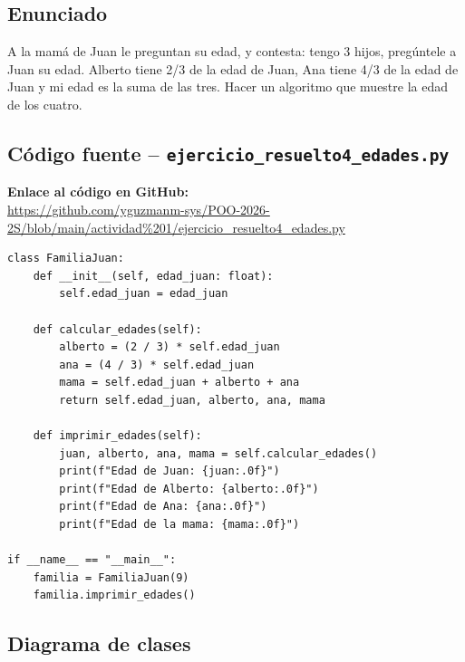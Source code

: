 \documentclass[12pt,a4paper]{article}
\begin{document}
\subsection{Enunciado}
A la mam\'a de Juan le preguntan su edad, y contesta: tengo 3 hijos, preg\'untele a Juan su edad. Alberto tiene 2/3 de la edad de Juan, Ana tiene 4/3 de la edad de Juan y mi edad es la suma de las tres. Hacer un algoritmo que muestre la edad de los cuatro.

\subsection{C\'odigo fuente -- \texttt{ejercicio\_resuelto4\_edades.py}}
\noindent \textbf{Enlace al c\'odigo en GitHub:}\\
\url{https://github.com/yguzmanm-sys/POO-2026-2S/blob/main/actividad%201/ejercicio_resuelto4_edades.py}\\[0.3cm]

\begin{lstlisting}[style=pythonstyle, caption={Familia de Juan -- ejercicio\_resuelto4\_edades.py}]
class FamiliaJuan:
    def __init__(self, edad_juan: float):
        self.edad_juan = edad_juan

    def calcular_edades(self):
        alberto = (2 / 3) * self.edad_juan
        ana = (4 / 3) * self.edad_juan
        mama = self.edad_juan + alberto + ana
        return self.edad_juan, alberto, ana, mama

    def imprimir_edades(self):
        juan, alberto, ana, mama = self.calcular_edades()
        print(f"Edad de Juan: {juan:.0f}")
        print(f"Edad de Alberto: {alberto:.0f}")
        print(f"Edad de Ana: {ana:.0f}")
        print(f"Edad de la mama: {mama:.0f}")

if __name__ == "__main__":
    familia = FamiliaJuan(9)
    familia.imprimir_edades()
\end{lstlisting}

\subsection{Diagrama de clases}
\end{document}
